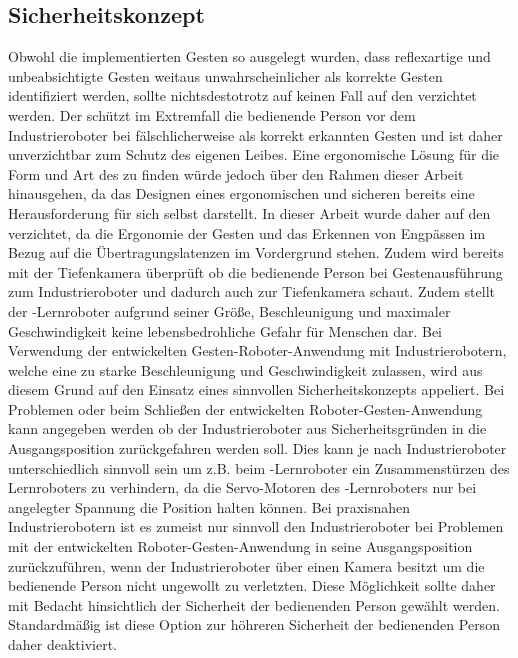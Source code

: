 \subsection{Sicherheitskonzept} %
Obwohl die implementierten Gesten so ausgelegt wurden, dass reflexartige und unbeabsichtigte Gesten weitaus unwahrscheinlicher als korrekte Gesten identifiziert werden, sollte nichtsdestotrotz auf keinen Fall auf den  verzichtet werden. Der  schützt im Extremfall die bedienende Person vor dem Industrieroboter bei fälschlicherweise als korrekt erkannten Gesten und ist daher unverzichtbar zum Schutz des eigenen Leibes. Eine ergonomische Lösung für die Form und Art des  zu finden würde jedoch über den Rahmen dieser Arbeit hinausgehen, da das Designen eines ergonomischen und sicheren  bereits eine Herausforderung für sich selbst darstellt. In dieser Arbeit wurde daher auf den  verzichtet, da die Ergonomie der Gesten und das Erkennen von Engpässen im Bezug auf die Übertragungslatenzen im Vordergrund stehen. Zudem wird bereits mit der Tiefenkamera überprüft ob die bedienende Person bei Gestenausführung zum Industrieroboter und dadurch auch zur Tiefenkamera schaut. Zudem stellt der -Lernroboter aufgrund seiner Größe, Beschleunigung und maximaler Geschwindigkeit keine lebensbedrohliche Gefahr für Menschen dar. Bei Verwendung der entwickelten Gesten-Roboter-Anwendung mit Industrierobotern, welche eine zu starke Beschleunigung und Geschwindigkeit zulassen, wird aus diesem Grund auf den Einsatz eines sinnvollen Sicherheitskonzepts appeliert. Bei Problemen oder beim Schließen der entwickelten Roboter-Gesten-Anwendung kann angegeben werden ob der Industrieroboter aus Sicherheitsgründen in die Ausgangsposition zurückgefahren werden soll. Dies kann je nach Industrieroboter unterschiedlich sinnvoll sein um z.B. beim -Lernroboter ein Zusammenstürzen des Lernroboters zu verhindern, da die Servo-Motoren des -Lernroboters nur bei angelegter Spannung die Position halten können. Bei praxisnahen Industrierobotern ist es zumeist nur sinnvoll den Industrieroboter bei Problemen mit der entwickelten Roboter-Gesten-Anwendung in seine Ausgangsposition zurückzuführen, wenn der Industrieroboter über einen Kamera besitzt um die bedienende Person nicht ungewollt zu verletzten. Diese Möglichkeit sollte daher mit Bedacht hinsichtlich der Sicherheit der bedienenden Person gewählt werden. Standardmäßig ist diese Option zur höhreren Sicherheit der bedienenden Person daher deaktiviert.

